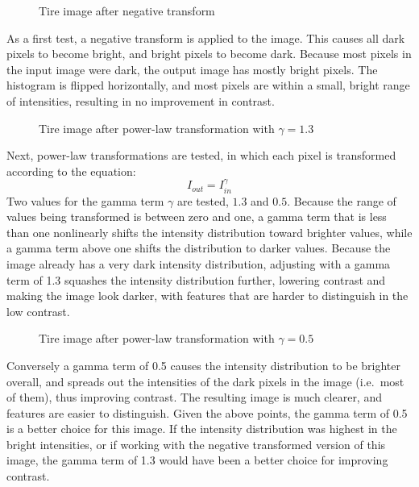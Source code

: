 \documentclass{sydeStyle}
\begin{document}
 \begin{figure}
	\begin{center}
	\end{center}
	\caption{Tire image after negative transform}
\end{figure}
As a first test, a negative transform is applied to the image.
This causes all dark pixels to become bright, and bright pixels to become dark.
Because most pixels in the input image were dark, the output image has mostly
bright pixels.
The histogram is flipped horizontally, and most pixels are within a small,
bright range of intensities, resulting in no improvement in contrast.

 \begin{figure}
	\begin{center}
	\end{center}
	\caption{Tire image after power-law transformation with $\gamma=1.3$}
\end{figure}
Next, power-law transformations are tested, in which each pixel is transformed
according to the equation:
\begin{displaymath}
	I_{out} = I_{in}^\gamma
\end{displaymath}
Two values for the gamma term $\gamma$ are tested, $1.3$ and $0.5$.
Because the range of values being transformed is between zero and one, a gamma
term that is less than one nonlinearly shifts the intensity distribution toward
brighter values, while a gamma term above one shifts the distribution to darker
values.
Because the image already has a very dark intensity distribution, adjusting with
a gamma term of 1.3 squashes the intensity distribution further, lowering
contrast and making the image look darker, with features that are harder to
distinguish in the low contrast.
 \begin{figure}
	\begin{center}
	\end{center}
	\caption{Tire image after power-law transformation with $\gamma=0.5$}
\end{figure}
Conversely a gamma term of 0.5 causes the intensity distribution to be brighter
overall, and spreads out the intensities of the dark pixels in the image (i.e.\
most of them), thus improving contrast.
The resulting image is much clearer, and features are easier to distinguish.
Given the above points, the gamma term of 0.5 is a better choice for this image.
If the intensity distribution was highest in the bright intensities, or if
working with the negative transformed version of this image, the gamma term of
1.3 would have been a better choice for improving contrast.
\end{document}
